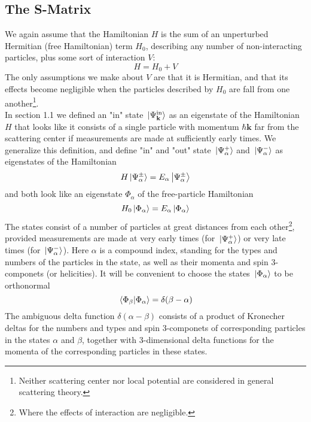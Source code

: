 \documentclass[12pt]{article}
\numberwithin{equation}{section}
\begin{document}
\subsection{The S-Matrix}
We again assume that the Hamiltonian $H$ is the sum of an unperturbed Hermitian (free Hamiltonian) term $H_0$, describing any number of non-interacting particles, plus some sort of interaction $V$:
\begin{equation}
    H = H_0 + V
\end{equation}
The only assumptions we make about $V$ are that it is Hermitian, and that its effects become negligible when the particles described by $H_0$ are fall from one another\footnote{Neither scattering center nor local potential are considered in general scattering theory.}.
\\\indent In section 1.1 we defined an "in" state $\ket*{\Psi_{\mathbf{k}}^{\text{in}}}$ as an eigenstate of the Hamiltonian $H$ that looks like it consists of a single particle with momentum $\hbar\mathbf{k}$ far from the scattering center if measurements are made at sufficiently early times.
We generalize this definition, and define "in" and "out" state $\ket*{\Psi_{\alpha}^{+}}$ and $\ket*{\Psi_{\alpha}^{-}}$ as eigenstates of the Hamiltonian
\begin{equation}
    H\ket*{\Psi_{\alpha}^{\pm}} = E_{\alpha}\ket{\Psi_{\alpha}^{\pm}}
\end{equation}
and both look like an eigenstate $\Phi_{\alpha}$ of the free-particle Hamiltonian
\begin{equation}
    H_0\ket*{\Phi_{\alpha}} = E_{\alpha}\ket*{\Phi_{\alpha}}
\end{equation}
The states consist of a number of particles at great distances from each other\footnote{Where the effects of interaction are negligible.}, provided measurements are made at very early times (for $\ket*{\Psi_{\alpha}^{+}}$) or very late times (for $\ket*{\Psi_{\alpha}^{-}}$).
Here $\alpha$ is a compound index, standing for the types and numbers of the particles in the state, as well as their momenta and spin 3-componets (or helicities).
It will be convenient to choose the states $\ket*{\Phi_{\alpha}}$ to be orthonormal
\begin{equation}
    \braket*{\Phi_{\beta}}{\Phi_{\alpha}} = \delta(\beta-\alpha)
\end{equation}
The ambiguous delta function $\delta(\alpha-\beta)$ consists of a product of Kronecher deltas for the numbers and types and spin 3-componets of corresponding particles in the states $\alpha$ and $\beta$, together with 3-dimensional delta functions for the momenta of the corresponding particles in these states.
\end{document}
